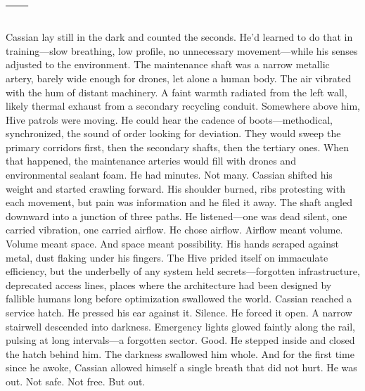 \documentclass[12pt,oneside]{book}
\begin{document}

\chapter{---}

Cassian lay still in the dark and counted the seconds.
He’d learned to do that in training—slow breathing, low profile, no unnecessary movement—while his senses adjusted to the environment. The maintenance shaft was a narrow metallic artery, barely wide enough for drones, let alone a human body. The air vibrated with the hum of distant machinery. A faint warmth radiated from the left wall, likely thermal exhaust from a secondary recycling conduit.
Somewhere above him, Hive patrols were moving.
He could hear the cadence of boots—methodical, synchronized, the sound of order looking for deviation. They would sweep the primary corridors first, then the secondary shafts, then the tertiary ones. When that happened, the maintenance arteries would fill with drones and environmental sealant foam.
He had minutes.
Not many.
Cassian shifted his weight and started crawling forward.
His shoulder burned, ribs protesting with each movement, but pain was information and he filed it away. The shaft angled downward into a junction of three paths. He listened—one was dead silent, one carried vibration, one carried airflow.
He chose airflow.
Airflow meant volume. Volume meant space. And space meant possibility.
His hands scraped against metal, dust flaking under his fingers. The Hive prided itself on immaculate efficiency, but the underbelly of any system held secrets—forgotten infrastructure, deprecated access lines, places where the architecture had been designed by fallible humans long before optimization swallowed the world.
Cassian reached a service hatch.
He pressed his ear against it.
Silence.
He forced it open.
A narrow stairwell descended into darkness. Emergency lights glowed faintly along the rail, pulsing at long intervals—a forgotten sector.
Good.
He stepped inside and closed the hatch behind him.
The darkness swallowed him whole.
And for the first time since he awoke, Cassian allowed himself a single breath that did not hurt.
He was out.
Not safe.
Not free.
But out.


\end{document}
